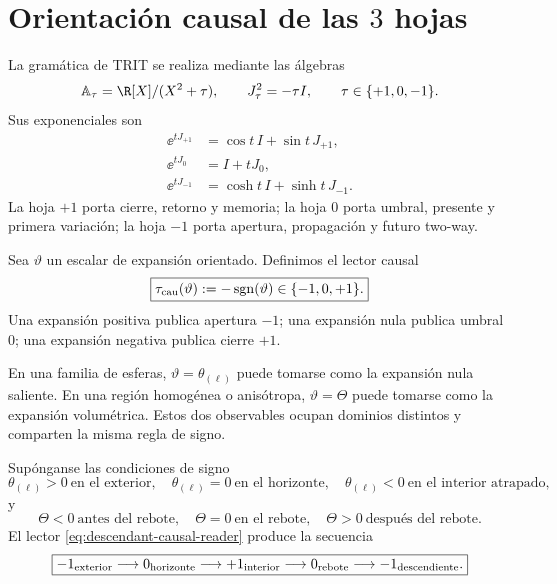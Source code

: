 \section{Orientación causal de las \(3\) hojas}

La gram\'atica de TRIT se realiza mediante las \'algebras
\begin{equation}
 \mathbb A_\tau=\R[X]/(X^2+\tau),
 \qquad
 J_\tau^2=-\tau I,
 \qquad
 \tau\in\{+1,0,-1\}.
 \label{eq:descendant-TRIT-algebras}
\end{equation}
Sus exponenciales son
\begin{align}
 \ee^{tJ_{+1}}&=\cos t\,I+\sin t\,J_{+1},
 \label{eq:descendant-elliptic}\\
 \ee^{tJ_0}&=I+tJ_0,
 \label{eq:descendant-parabolic}\\
 \ee^{tJ_{-1}}&=\cosh t\,I+\sinh t\,J_{-1}.
 \label{eq:descendant-hyperbolic}
\end{align}
La hoja \(+1\) porta cierre, retorno y memoria; la hoja \(0\) porta umbral,
presente y primera variaci\'on; la hoja \(-1\) porta apertura, propagaci\'on y
futuro two-way.

Sea \(\vartheta\) un escalar de expansi\'on orientado. Definimos el lector
causal
\begin{equation}
 \boxed{
 \tau_{\rm cau}(\vartheta):=-\operatorname{sgn}(\vartheta)
 \in\{-1,0,+1\}.}
 \label{eq:descendant-causal-reader}
\end{equation}
Una expansi\'on positiva publica apertura \(-1\); una expansi\'on nula
publica umbral \(0\); una expansi\'on negativa publica cierre \(+1\).

En una familia de esferas, \(\vartheta=\theta_{(\ell)}\) puede tomarse como
la expansi\'on nula saliente. En una regi\'on homog\'enea o anis\'otropa,
\(\vartheta=\Theta\) puede tomarse como la expansi\'on volum\'etrica. Estos
dos observables ocupan dominios distintos y comparten la misma regla de
signo.

\begin{proposition}
\label{prop:descendant-double-threshold}
Sup\'onganse las condiciones de signo
\begin{equation}
 \theta_{(\ell)}>0\ \text{en el exterior},
 \quad
 \theta_{(\ell)}=0\ \text{en el horizonte},
 \quad
 \theta_{(\ell)}<0\ \text{en el interior atrapado},
 \label{eq:descendant-null-signs}
\end{equation}
y
\begin{equation}
 \Theta<0\ \text{antes del rebote},
 \quad
 \Theta=0\ \text{en el rebote},
 \quad
 \Theta>0\ \text{despu\'es del rebote}.
 \label{eq:descendant-volume-signs}
\end{equation}
El lector \cref{eq:descendant-causal-reader} produce la secuencia
\begin{equation}
 \boxed{
 -1_{\rm exterior}
 \longrightarrow0_{\rm horizonte}
 \longrightarrow+1_{\rm interior}
 \longrightarrow0_{\rm rebote}
 \longrightarrow-1_{\rm descendiente}.}
 \label{eq:descendant-five-stage-sequence}
\end{equation}
\end{proposition}

